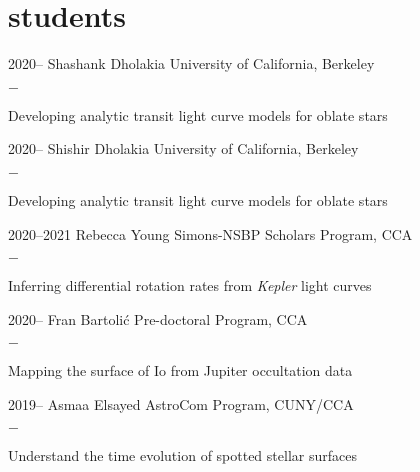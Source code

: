\documentclass[]{luger-cv} %
\begin{document}
\section{students}
\begin{entrylist}


    \entry
    {2020--}
    {Shashank Dholakia}
    {University of California, Berkeley}
    {%
        \vspace{-1em}
        \begin{list}{{\color{numcolor}$-$}}{\cvlist}
            \item Developing analytic transit light curve models for oblate stars
        \end{list}
    }


    \entry
    {2020--}
    {Shishir Dholakia}
    {University of California, Berkeley}
    {%
        \vspace{-1em}
        \begin{list}{{\color{numcolor}$-$}}{\cvlist}
            \item Developing analytic transit light curve models for oblate stars
        \end{list}
    }


    \entry
    {2020--2021}
    {Rebecca Young}
    {Simons-NSBP Scholars Program, CCA}
    {%
        \vspace{-1em}
        \begin{list}{{\color{numcolor}$-$}}{\cvlist}
            \item Inferring differential rotation rates from \emph{Kepler} light curves
        \end{list}
    }


    \entry
    {2020--}
    {Fran Bartoli\'c}
    {Pre-doctoral Program, CCA}
    {%
        \vspace{-1em}
        \begin{list}{{\color{numcolor}$-$}}{\cvlist}
            \item Mapping the surface of Io from Jupiter occultation data
        \end{list}
    }

    \entry
    {2019--}
    {Asmaa Elsayed}
    {AstroCom Program, CUNY/CCA}
    {%
        \vspace{-1em}
        \begin{list}{{\color{numcolor}$-$}}{\cvlist}
            \item Understand the time evolution of spotted stellar surfaces
        \end{list}
    }


\end{entrylist}
\end{document}
